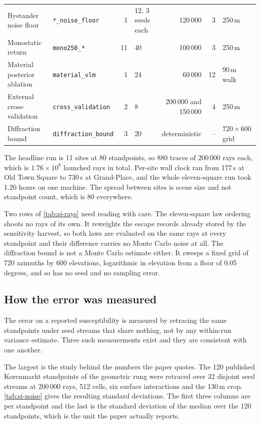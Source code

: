 \documentclass[journal]{IEEEtran}
\begin{document}
\begin{table}[t]
\begin{tabular}{llrlrrl}
    Bystander noise floor & \texttt{*\_noise\_floor} & 1 & 12, 3 seeds each & 120\,000 & 3 & 250\,m \\
    Monostatic return & \texttt{mono250\_*} & 11 & 40 & 100\,000 & 3 & 250\,m \\
    Material posterior ablation & \texttt{material\_vlm} & 1 & 24 & 60\,000 & 12 & 90\,m walk \\
    External cross-validation & \texttt{cross\_validation} & 2 & 8 & 200\,000 and 150\,000 & 4 & 250\,m \\
    Diffraction bound & \texttt{diffraction\_bound} & 3 & 20 & deterministic & -- & $720 \times 600$ grid \\
    \bottomrule
  \end{tabular}
\end{table}

The headline run is 11 sites at 80 standpoints, so 880 traces of 200\,000 rays
each, which is $1.76 \times 10^{8}$ launched rays in total. Per-site wall clock
ran from 177\,s at Old Town Square to 730\,s at Grand-Place, and the whole
eleven-square run took 1.20 hours on one machine. The spread between sites is
scene size and not standpoint count, which is 80 everywhere.

Two rows of \cref{tab:si-rays} need reading with care. The eleven-square law
ordering shoots no rays of its own. It reweights the escape records already
stored by the sensitivity harvest, so both laws are evaluated on the same rays
at every standpoint and their difference carries no Monte Carlo noise at all.
The diffraction bound is not a Monte Carlo estimate either. It sweeps a fixed
grid of 720 azimuths by 600 elevations, logarithmic in elevation from a floor of
0.05 degrees, and so has no seed and no sampling error.

\subsection{How the error was measured}
\label{sec:si-seeds-error}

The error on a reported susceptibility is measured by retracing the same
standpoints under seed streams that share nothing, not by any within-run
variance estimate. Three such measurements exist and they are consistent with
one another.

The largest is the study behind the numbers the paper quotes. The 120 published
Korenmarkt standpoints of the geometric rung were retraced over 32 disjoint seed
streams at 200\,000 rays, 512 cells, six surface interactions and the 130\,m
crop. \cref{tab:si-noise} gives the resulting standard deviations. The first
three columns are per standpoint and the last is the standard deviation of the
median over the 120 standpoints, which is the unit the paper actually reports.
\end{document}
